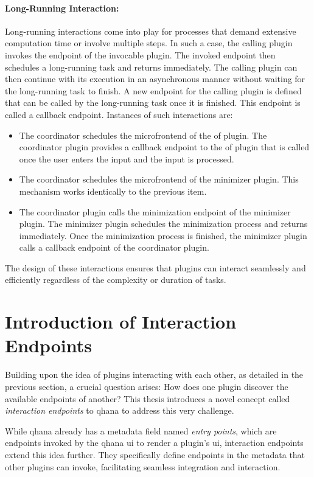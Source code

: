 \documentclass[
  a4paper,  %
  twoside,  %
  bibliography=totoc,
  headsepline,
  cleardoublepage=empty,
  parskip=half,
  draft=false
]{scrbook}
\begin{document}
\paragraph{Long-Running Interaction:}

Long-running interactions come into play for processes that demand extensive computation time or involve multiple steps.
In such a case, the calling plugin invokes the endpoint of the invocable plugin.
The invoked endpoint then schedules a long-running task and returns immediately.
The calling plugin can then continue with its execution in an asynchronous manner without waiting for the long-running task to finish.
A new endpoint for the calling plugin is defined that can be called by the long-running task once it is finished.
This endpoint is called a callback endpoint.
Instances of such interactions are:
\begin{itemize}
    \item The coordinator schedules the microfrontend of the \gls{of} plugin.
    The coordinator plugin provides a callback endpoint to the \gls{of} plugin that is called once the user enters the input and the input is processed.
    \item The coordinator schedules the microfrontend of the minimizer plugin.
    This mechanism works identically to the previous item.
    \item The coordinator plugin calls the minimization endpoint of the minimizer plugin.
    The minimizer plugin schedules the minimization process and returns immediately.
    Once the minimization process is finished, the minimizer plugin calls a callback endpoint of the coordinator plugin.
\end{itemize}
The design of these interactions ensures that plugins can interact seamlessly and efficiently regardless of the complexity or duration of tasks.

\section{Introduction of Interaction Endpoints}
\label{sec:introie}

Building upon the idea of plugins interacting with each other, as detailed in the previous section, a crucial question arises:
How does one plugin discover the available endpoints of another?
This thesis introduces a novel concept called \textit{interaction endpoints} to \gls{qhana} to address this very challenge.

While \gls{qhana} already has a metadata field named \emph{entry points}, which are endpoints invoked by the \gls{qhana} \gls{ui} to render a plugin's \gls{ui}, interaction endpoints extend this idea further.
They specifically define endpoints in the metadata that other plugins can invoke, facilitating seamless integration and interaction.
\end{document}
